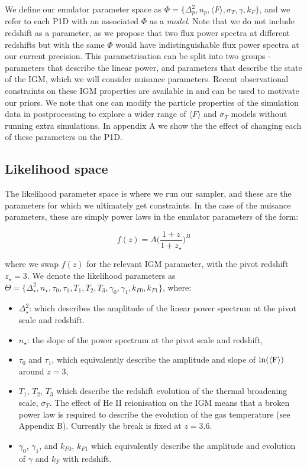 \documentclass[]{article}
\begin{document}
\noindent We define our emulator parameter space as $\Phi=\{ \Delta^2_p,n_p,\langle F\rangle,\sigma_T,\gamma,k_F \}$, and we refer to each P1D with an associated 
$\Phi$ as a \textit{model}. Note that we do not include redshift as a parameter, as we 
propose that two flux power spectra at different redshifts but with the same $\Phi$ would 
have indistinguishable flux power spectra at our current precision. This parametrisation 
can be split into two groups - parameters that describe the linear power, and parameters 
that describe the state of the IGM, which we will consider nuisance parameters. Recent 
observational constraints on these IGM properties are available in \cite{Walther2018} and 
can be used to motivate our priors. We note that one can modify the particle properties 
of the simulation data in postprocessing to explore a wider range of $\langle F\rangle$ 
and $\sigma_T$ models without running extra simulations. In appendix A we show the the
effect of changing each of these parameters on the P1D.

\subsection{Likelihood space}
The likelihood parameter space is where we run our sampler, and these are the parameters 
for which we ultimately get constraints. In the case of the nuisance parameters,
these are simply power laws in the emulator parameters of the form:

\begin{equation}
    f(z)=A\bigg(\frac{1+z}{1+z_\star}\bigg)^B
\end{equation}

\noindent where we swap $f(z)$ for the relevant IGM parameter, with the pivot 
redshift $z_\star=3$. We denote the likelihood parameters as
$\Theta=\{ \Delta^2_\star, n_\star, \tau_0, \tau_1, T_1, T_2, T_3, \gamma_0, \gamma_1, k_{F0}, k_{F1} \}$, where:

\begin{itemize}
    \item $\Delta^2_\star$: which describes the amplitude of the linear power spectrum at 
    the pivot scale and redshift.
    \item $n_\star$: the slope of the power spectrum at the pivot scale and redshift,
    \item  $\tau_0$ and $\tau_1$, which equivalently describe the amplitude and slope of $\rm{ln}(\langle F\rangle)$ around $z=3$,
    \item  $T_1$, $T_2$, $T_3$ which describe the redshift evolution of the thermal 
    broadening scale, $\sigma_T$. The effect of He II reionisation on the IGM means that 
    a broken power law is required to describe the evolution of the gas temperature (see 
    Appendix B). Currently the break is fixed at $z=3.6$.
    \item $\gamma_0$, $\gamma_1$, and $k_{F0}$, $k_{F1}$ which equivalently describe the amplitude and evolution of $\gamma$ and $k_F$ with redshift.
\end{itemize}
\end{document}

